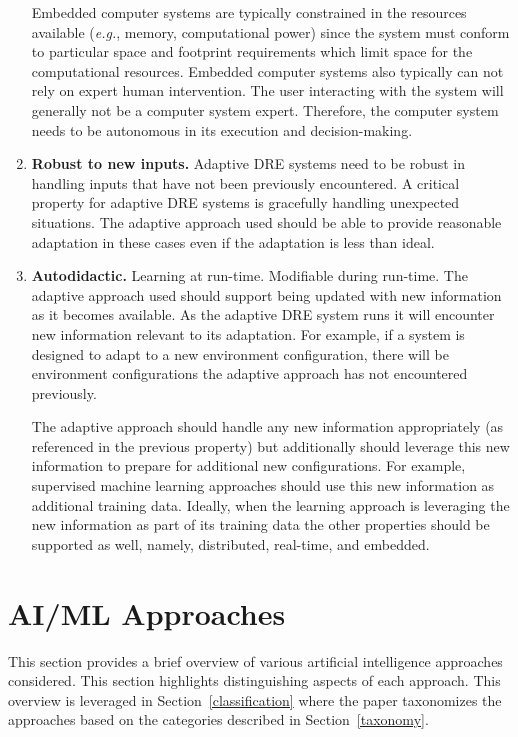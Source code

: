 \documentclass[conference]{IEEEtran}
\begin{document}
\begin{enumerate}
Embedded computer systems are typically constrained in the resources available (\emph{e.g.}, memory, computational power) since the system must conform to particular space and footprint requirements which limit space for the computational resources. Embedded computer systems also typically can not rely on expert human intervention. The user interacting with the system will generally not be a computer system expert. Therefore, the computer system needs to be autonomous in its execution and decision-making.

\item \textbf{Robust to new inputs.} Adaptive DRE systems need to be robust in handling inputs that have not been previously encountered. A critical property for adaptive DRE systems is gracefully handling unexpected situations. The adaptive approach used should be able to provide reasonable adaptation in these cases even if the adaptation is less than ideal.

\item \textbf{Autodidactic.} Learning at run-time. Modifiable during run-time. The adaptive approach used should support being updated with new information as it becomes available. As the adaptive DRE system runs
it will encounter new information relevant to its adaptation. For example, if a system
is designed to adapt to a new environment configuration, there will be environment
configurations the adaptive approach has not encountered previously.

The adaptive approach should handle any new information appropriately (as referenced in the previous property) but additionally should
leverage this new information to prepare for additional new configurations. For example, supervised
machine learning approaches should use this new information as additional training data.
Ideally, when the learning approach is leveraging the new information as part of its training data the other properties should be supported as well, namely, distributed, real-time, and embedded.

\end{enumerate}

\section{AI/ML Approaches}
\label{ml-approaches}

This section provides a brief overview of various artificial intelligence approaches considered. This section highlights distinguishing aspects of each approach.
This overview is leveraged in Section~\ref{classification} where the paper
taxonomizes the approaches based on the categories described in
Section~\ref{taxonomy}.
\end{document}
